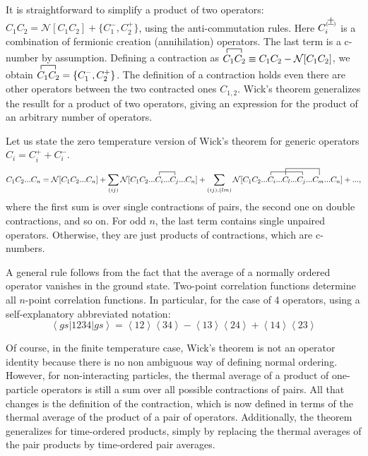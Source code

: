 It is straightforward to simplify a product of two operators: $C_1 C_2 = \mathcal{N} [ C_1 C_2 ] + \{ C_1^- , C_2^+ \} $, using the anti-commutation rules.
Here $C_i^{\Pm}$ is a combination of fermionic creation (annihilation) operators. 
The last term is a c-number by assumption.
Defining a contraction as $\contraction{}{C}{ {}_1 }{C_2}
C_1 C_2 \equiv C_1 C_2 - \mathcal{N}[ C_1 C_2 ]$, we obtain $\contraction{}{C}{ {}_1 }{C_2}
C_1 C_2 =  \{ C_1^- , C_2^+ \}  $.
The definition of a contraction holds even there are other operators between the two contracted ones $C_{1, 2}$.
Wick's theorem generalizes the resullt for a product of two operators, giving an expression for the product of an arbitrary number of operators.

Let us state the zero temperature version of Wick's theorem for generic operators $C_i= C_i^+ + C_i^-$.
\begin{equation}\label{eq:wickState}
C_1 C_2 ... C_n = \mathcal{N} [ C_1 C_2 ... C_n ] + \sum_{(ij)} \mathcal{N} [ C_1 C_2 ...
\contraction{}{C_i}{...}{C_j}
C_i ... C_j ... C_n ]
+ \sum_{(ij), (lm)} \mathcal{N} [ C_1 C_2 ...
\contraction{}{C}{ {}_i ... C_l ... }{C_j}
C_i ... 
\contraction[2ex]{}{C}{ {}_l ... C_j ... }{C_m}C_l ... C_j ... C_m ... C_n ] + ... ,
\end{equation}
where the first sum is over single contractions of pairs, the second one on double contractions, and so on.
For odd $n$, the last term contains single unpaired operators.
Otherwise, they are just products of contractions, which are c-numbers.

A general rule follows from the fact that the average of a normally ordered operator vanishes in the ground state.
Two-point correlation functions determine all $n$-point correlation functions.
In particular, for the case of 4 operators, using a self-explanatory abbreviated notation:
\begin{equation}
\left\langle gs | 1234 | gs \right\rangle = \left\langle 12 \right\rangle \left\langle 34 \right\rangle - \left\langle 13 \right\rangle \left\langle 24 \right\rangle + \left\langle 14 \right\rangle \left\langle 23 \right\rangle
\end{equation}

Of course, in the finite temperature case, Wick's theorem is not an operator identity because there is no non ambiguous way of defining normal ordering.
However, for non-interacting particles, the thermal average of a product of one-particle operators is still a sum over all possible contractions of pairs.
All that changes is the definition of the contraction, which is now defined in terms of the thermal average of the product of a pair of operators.
Additionally, the theorem generalizes for time-ordered products, simply by replacing the thermal averages of the pair products by time-ordered pair averages.

